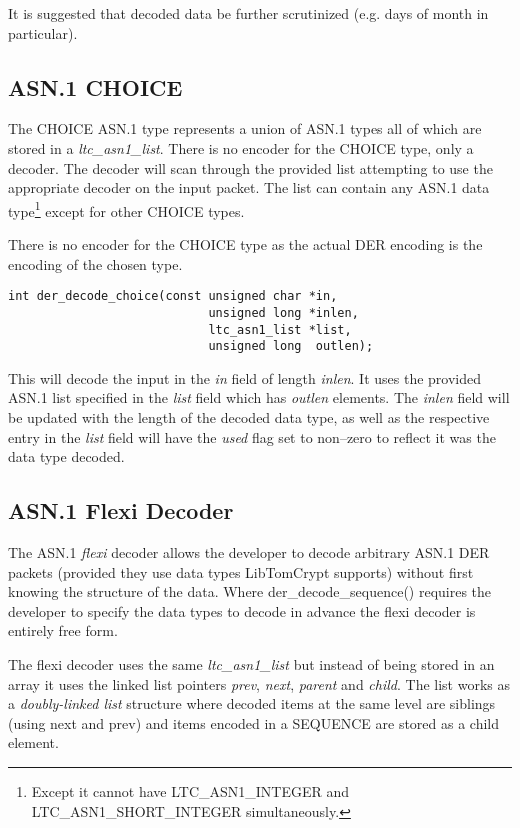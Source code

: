 \documentclass[synpaper]{book}
\begin{document}
It is suggested that decoded data be further scrutinized (e.g. days of month in particular).

\subsection{ASN.1 CHOICE}

The CHOICE ASN.1 type represents a union of ASN.1 types all of which are stored in a \textit{ltc\_asn1\_list}.  There is no encoder for the CHOICE type, only a
decoder.  The decoder will scan through the provided list attempting to use the appropriate decoder on the input packet.  The list can contain any ASN.1 data
type\footnote{Except it cannot have LTC\_ASN1\_INTEGER and LTC\_ASN1\_SHORT\_INTEGER simultaneously.} except for other CHOICE types.

There is no encoder for the CHOICE type as the actual DER encoding is the encoding of the chosen type.

\begin{verbatim}
int der_decode_choice(const unsigned char *in,
                            unsigned long *inlen,
                            ltc_asn1_list *list,
                            unsigned long  outlen);
\end{verbatim}

This will decode the input in the \textit{in} field of length \textit{inlen}.  It uses the provided ASN.1 list specified in the \textit{list} field which has
\textit{outlen} elements.  The \textit{inlen} field will be updated with the length of the decoded data type, as well as the respective entry in the \textit{list} field
will have the \textit{used} flag set to non--zero to reflect it was the data type decoded.

\subsection{ASN.1 Flexi Decoder}
The ASN.1 \textit{flexi} decoder allows the developer to decode arbitrary ASN.1 DER packets (provided they use data types LibTomCrypt supports) without first knowing
the structure of the data.  Where der\_decode\_sequence() requires the developer to specify the data types to decode in advance the flexi decoder is entirely
free form.

The flexi decoder uses the same \textit{ltc\_asn1\_list} but instead of being stored in an array it uses the linked list pointers \textit{prev}, \textit{next}, \textit{parent}
and \textit{child}.  The list works as a \textit{doubly-linked list} structure where decoded items at the same level are siblings (using next and prev) and items
encoded in a SEQUENCE are stored as a child element.
\end{document}
